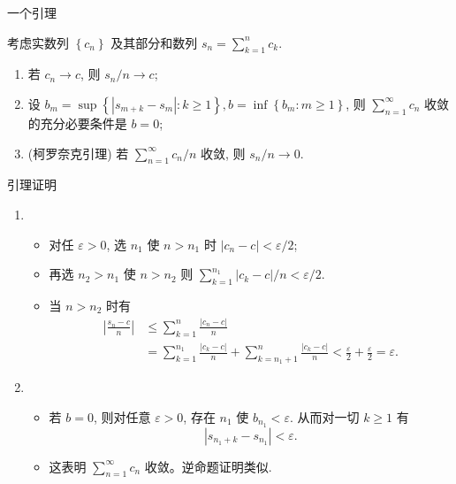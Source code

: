 \begin{frame}{一个引理}
	\begin{lem}
		考虑实数列 $\left\{c_{n}\right\}$ 及其部分和数列 $s_{n}=\sum_{k=1}^{n} c_{k}$.
		\begin{enumerate}[1.]
		  \item 若 $c_{n} \rightarrow c$, 则 $s_{n} / n \rightarrow c$;
		\item  设 $b_{m}=\sup \left\{\left|s_{m+k}-s_{m}\right|: k \geq 1\right\}, b=\inf \left\{b_{m}: m \geq 1\right\}$, 则 $\sum_{n=1}^{\infty} c_{n}$ 收敛的充分必要条件是 $b=0$;
		\item (柯罗奈克引理) 若 $\sum_{n=1}^{\infty} c_{n} / n$ 收敛, 则 $s_{n} / n \rightarrow 0$.
		\end{enumerate}
	\end{lem}

\end{frame}

\begin{frame}{引理证明}
\begin{enumerate}[1.]
  \item
  \begin{itemize}
	\item 对任 $\varepsilon>0$, 选 $n_{1}$ 使 $n>n_{1}$ 时 $\left|c_{n}-c\right|<\varepsilon / 2$;
	\item 再选 $n_{2}>n_{1}$ 使 $n>n_{2}$ 则 $\sum_{k=1}^{n_{1}}\left|c_{k}-c\right| / n<\varepsilon / 2$.
	\item 当 $n>n_{2}$ 时有
	\begin{align}
	\left|\frac{s_{n}-c}{n}\right| &\leq \sum_{k=1}^{n} \frac{\left|c_{n}-c\right|}{n} \\
	&=\sum_{k=1}^{n_{1}} \frac{\left|c_{k}-c\right|}{n}+\sum_{k=n_1+1}^{n} \frac{\left|c_{k}-c\right|}{n}<\frac{\varepsilon}{2}+\frac{\varepsilon}{2}=\varepsilon .
	\end{align}
\end{itemize}
\item \begin{itemize}
	\item 若 $b=0$, 则对任意 $\varepsilon>0$, 存在 $n_{1}$ 使 $b_{n_{1}}<\varepsilon$. 从而对一切 $k \geq 1$ 有
	\[\left|s_{n_{1}+k}-s_{n_{1}}\right|<\varepsilon.\]
	\item 这表明 $\sum_{n=1}^{\infty} c_{n}$ 收敛。逆命题证明类似.
\end{itemize}


\end{enumerate}

\end{frame}

